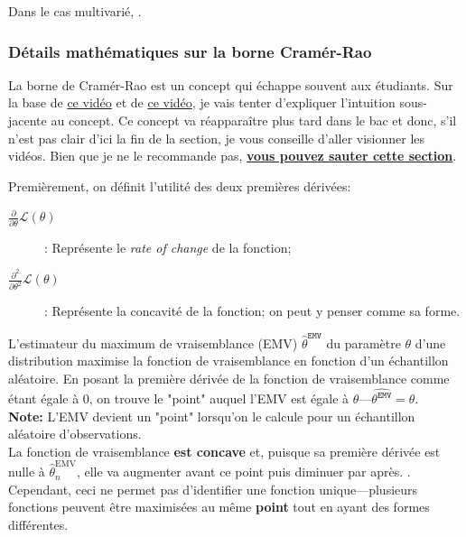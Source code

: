\documentclass[10pt, french]{article}
\begin{document}
\begin{multicols*}{2}
\begin{definitionNOHFILL}
Dans le cas multivarié, .
\end{definitionNOHFILL}



\subsubsection*{Détails mathématiques sur la borne Cramér-Rao}
La borne de Cramér-Rao est un concept qui échappe souvent aux étudiants. Sur la base de \hyperlink{https://www.youtube.com/watch?v=igQIsYAlKlY}{\color{blue}ce vidéo} et de \hyperlink{https://www.youtube.com/watch?v=i0JiSddCXMM}{\color{blue}ce vidéo}, je vais tenter d'expliquer l'intuition sous-jacente au concept. Ce concept va réapparaître plus tard dans le bac et donc, s’il n’est pas clair d’ici la fin de la section, je vous conseille d’aller visionner les vidéos.	Bien que je ne le recommande pas, \textbf{\underline{vous pouvez sauter cette section}}.

Premièrement, on définit l'utilité des deux premières dérivées:
\begin{description}
	\item[$\frac{\partial}{\partial\theta} \mathcal{L}(\theta)$]: Représente le \og \textit{rate of change}\fg{} de la fonction;
	\item[$\frac{\partial^{2}}{\partial\theta^{2}} \mathcal{L}(\theta)$]: Représente la concavité de la fonction; on peut y penser comme sa forme.
\end{description}

L'estimateur du maximum de vraisemblance (EMV) $\hat\theta^{\texttt{EMV}}$ du paramètre $\theta$ d'une distribution maximise la fonction de vraisemblance en fonction d'un échantillon aléatoire. En posant la première dérivée de la fonction de vraisemblance comme étant égale à 0, on trouve le "point" auquel l'EMV est égale à $\theta$---$\hat{\theta^{\texttt{EMV}}}	=	\theta$. \\

\textbf{Note:}	L'EMV devient un "point" lorsqu'on le calcule pour un échantillon aléatoire d'observations.\\

La fonction de vraisemblance \textbf{est concave} et, puisque sa première dérivée est nulle à $\hat{\theta}^{\text{EMV}}_{n}$, elle va augmenter avant ce point puis diminuer par après. . Cependant, ceci ne permet pas d'identifier une fonction unique---plusieurs fonctions peuvent être maximisées au même \textbf{point} tout en ayant des formes différentes.	\\


\end{multicols*}
\end{document}
